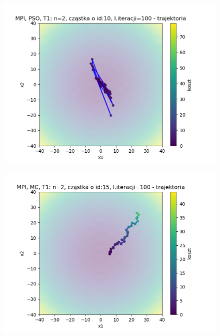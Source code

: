 \documentclass[11pt, a4paper, oneside]{article}
\begin{document}

\begin{figure}[H]
\centering
\begin{minipage}[b]{\dimexpr.5\textwidth-1em}
  \centering
  \includegraphics[width=1\linewidth]{grafiki/MPI_PSO_T1/MPI_PSO_T1_trajectory_id10.png}
  \label{fig:trajektoriaWybrana:PSO1}
\end{minipage} \hfill
\begin{minipage}[b]{\dimexpr.5\textwidth-1em}
  \centering
  \includegraphics[width=1\linewidth]{grafiki/MPI_MC_T1/MPI_ MC_T1_trajectory_id15.png}
  \label{fig:trajektoriaWybrana:MC1}
\end{minipage}
\end{figure}
\end{document}
